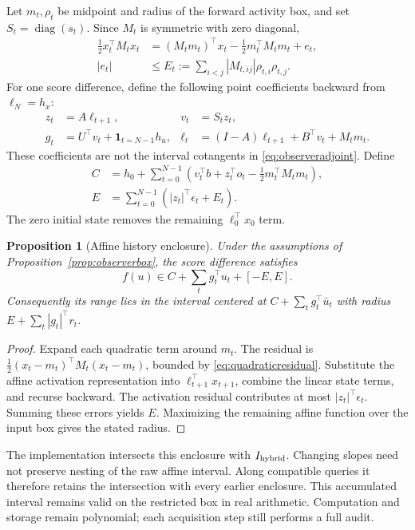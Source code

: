 \documentclass[11pt,a4paper]{article}
\newtheorem{proposition}[theorem]{Proposition}
\theoremstyle{definition}\newtheorem{definition}[theorem]{Definition}
\begin{document}
Let $m_t,\rho_t$ be midpoint and radius of the forward activity box, and set $S_t=\operatorname{diag}(s_t)$. Since $M_t$ is symmetric with zero diagonal,
\begin{align}
 \tfrac12x_t^\top M_tx_t
 &= (M_tm_t)^\top x_t-\tfrac12m_t^\top M_tm_t+e_t,\\
 |e_t|&\leq E_t:=\sum_{i<j}|M_{t,ij}|\rho_{t,i}\rho_{t,j}.
 \label{eq:quadraticresidual}
\end{align}
For one score difference, define the following point coefficients backward from $\ell_N=h_x$:
\begin{align}
 z_t&=A\ell_{t+1},& v_t&=S_tz_t,\\
 g_t&=U^\top v_t+\mathbf1_{t=N-1}h_u,&
 \ell_t&=(I-A)\ell_{t+1}+B^\top v_t+M_tm_t.
 \label{eq:affinebackward}
\end{align}
These coefficients are not the interval cotangents in \eqref{eq:observeradjoint}. Define
\begin{align}
 C&=h_0+\sum_{t=0}^{N-1}\left(v_t^\top b+z_t^\top o_t-\tfrac12m_t^\top M_tm_t\right),\\
 E&=\sum_{t=0}^{N-1}\left(|z_t|^\top\epsilon_t+E_t\right).
\end{align}
The zero initial state removes the remaining $\ell_0^\top x_0$ term.

\begin{proposition}[Affine history enclosure]\label{prop:affinehistory}
Under the assumptions of Proposition~\ref{prop:observerbox}, the score difference satisfies
\[
 f(u)\in C+\sum_t g_t^\top u_t+[-E,E].
\]
Consequently its range lies in the interval centered at $C+\sum_tg_t^\top\bar u_t$ with radius $E+\sum_t|g_t|^\top r_t$.
\end{proposition}
\begin{proof}
Expand each quadratic term around $m_t$. The residual is $\tfrac12(x_t-m_t)^\top M_t(x_t-m_t)$, bounded by \eqref{eq:quadraticresidual}. Substitute the affine activation representation into $\ell_{t+1}^\top x_{t+1}$, combine the linear state terms, and recurse backward. The activation residual contributes at most $|z_t|^\top\epsilon_t$. Summing these errors yields $E$. Maximizing the remaining affine function over the input box gives the stated radius.
\end{proof}
The implementation intersects this enclosure with $I_{\rm hybrid}$. Changing slopes need not preserve nesting of the raw affine interval. Along compatible queries it therefore retains the intersection with every earlier enclosure. This accumulated interval remains valid on the restricted box in real arithmetic. Computation and storage remain polynomial; each acquisition step still performs a full audit.
\end{document}
